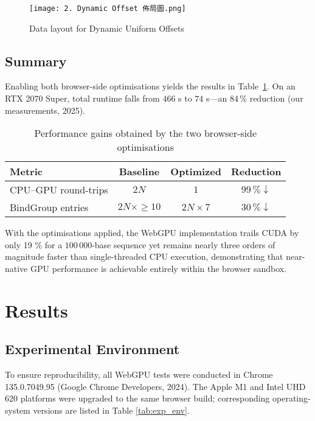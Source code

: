 \documentclass[PhD]{PHlab-thesis}
\begin{document}
\begin{figure}[htbp]
  \centering
  \texttt{[image: 2. Dynamic Offset 佈局圖.png]}
  \caption{Data layout for Dynamic Uniform Offsets}
  \label{fig:dynamic-offset-layout}
\end{figure}
\newpage
\section{Summary}

Enabling both browser-side optimisations yields the results in Table~\ref{tab:opt_performance}. On an RTX 2070 Super, total runtime falls from $466$ s to $74$ s—an 84\,\% reduction (our measurements, 2025).

\begin{table}[h]
  \centering
  \setlength{\tabcolsep}{6pt}
  \renewcommand{\arraystretch}{1.35}
  \small
  \begin{tabularx}{\textwidth}{|X|c|c|c|}
    \hline
    Metric & Baseline & Optimized & Reduction \\
    \hline
    CPU–GPU round-trips & $2N$ & $1$ & $99\,\%\!\downarrow$ \\
    BindGroup entries    & $2N \times \ge 10$ & $2N \times 7$ & $30\,\%\!\downarrow$ \\
    \hline
  \end{tabularx}
  \caption{Performance gains obtained by the two browser-side optimisations}
  \label{tab:opt_performance}
\end{table}

With the optimisations applied, the WebGPU implementation trails CUDA by only 19 \% for a \(100\,000\)-base sequence yet remains nearly three orders of magnitude faster than single-threaded CPU execution, demonstrating that near-native GPU performance is achievable entirely within the browser sandbox.




	
\chapter{Results}

\section{Experimental Environment}
To ensure reproducibility, all WebGPU tests were conducted in Chrome 135.0.7049.95 (Google Chrome Developers, 2024). The Apple M1 and Intel UHD 620 platforms were upgraded to the same browser build; corresponding operating-system versions are listed in Table \ref{tab:exp_env}.
\end{document}
